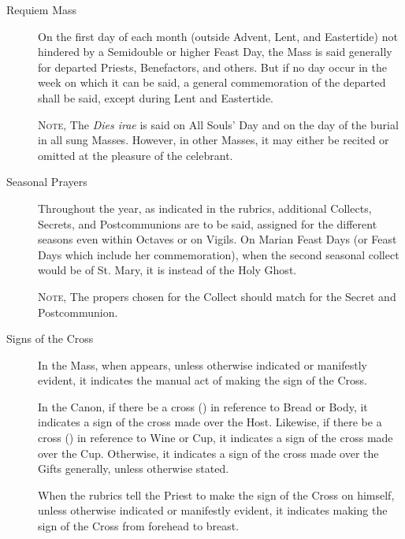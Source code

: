 \begin{description}
    \item[Requiem Mass] On the first day of each month (outside Advent, Lent, and Eastertide) not hindered by a Semidouble or higher Feast Day, the Mass is said generally for departed Priests, Benefactors, and others. But if no day occur in the week on which it can be said, a general commemoration of the departed shall be said, except during Lent and Eastertide.\par
    \textsc{Note,} The \emph{Dies irae} is said on All Souls' Day and on the day of the burial in all sung Masses. However, in other Masses, it may either be recited or omitted at the pleasure of the celebrant.
    \item[Seasonal Prayers] Throughout the year, as indicated in the rubrics, additional Collects, Secrets, and Postcommunions are to be said, assigned for the different seasons even within Octaves or on Vigils. On Marian Feast Days (or Feast Days which include her commemoration), when the second seasonal collect would be of St. Mary, it is instead of the Holy Ghost.\par
    \textsc{Note,} The propers chosen for the Collect should match for the Secret and Postcommunion.
    \item[Signs of the Cross] In the Mass, when {} appears, unless otherwise indicated or manifestly evident, it indicates the manual act of making the sign of the Cross.\par
    In the Canon, if there be a cross ({}) in reference to Bread or Body, it indicates a sign of the cross made over the Host. Likewise, if there be a cross ({}) in reference to Wine or Cup, it indicates a sign of the cross made over the Cup. Otherwise, it indicates a sign of the cross made over the Gifts generally, unless otherwise stated.\par
    When the rubrics tell the Priest to make the sign of the Cross on himself, unless otherwise indicated or manifestly evident, it indicates making the sign of the Cross from forehead to breast.
\end{description}